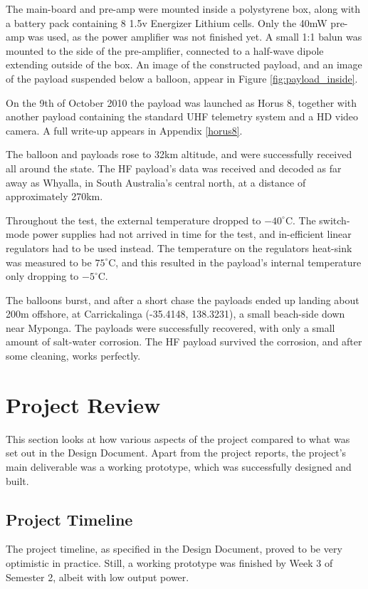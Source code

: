 \documentclass[a4paper,12pt]{article}
\begin{document}
The main-board and pre-amp were mounted inside a polystyrene box, along with a battery pack containing 8 1.5v Energizer Lithium cells. Only the 40mW pre-amp was used, as the power amplifier was not finished yet. A small 1:1 balun was mounted to the side of the pre-amplifier, connected to a half-wave dipole extending outside of the box. An image of the constructed payload, and an image of the payload suspended below a balloon, appear in Figure \ref{fig:payload_inside}.

On the 9th of October 2010 the payload was launched as Horus 8, together with another payload containing the standard UHF telemetry system and a HD video camera. A full write-up appears in Appendix \ref{horus8}. 

The balloon and payloads rose to 32km altitude, and were successfully received all around the state. The HF payload's data was received and decoded as far away as Whyalla, in South Australia's central north, at a distance of approximately 270km.

Throughout the test, the external temperature dropped to $-40^\circ$C. The switch-mode power supplies had not arrived in time for the test, and in-efficient linear regulators had to be used instead. The temperature on the regulators heat-sink was measured to be $75^\circ$C, and this resulted in the payload's internal temperature only dropping to $-5^\circ$C. 

The balloons burst, and after a short chase the payloads ended up landing about 200m offshore, at Carrickalinga (-35.4148, 138.3231), a small beach-side down near Myponga. The payloads were successfully recovered, with only a small amount of salt-water corrosion. The HF payload survived the corrosion, and after some cleaning, works perfectly.


\section{Project Review}
This section looks at how various aspects of the project compared to what was set out in the Design Document\citep{ref:designdoc}. Apart from the project reports, the project's main deliverable was a working prototype, which was successfully designed and built.

\subsection{Project Timeline}
The project timeline, as specified in the Design Document, proved to be very optimistic in practice. Still, a working prototype was finished by Week 3 of Semester 2, albeit with low output power.
\end{document}
